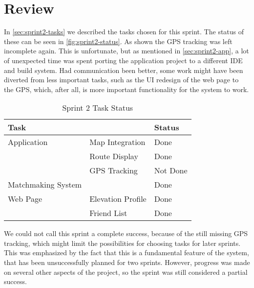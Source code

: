 \section{Review}
\label{sec:sprint2-review}

In \autoref{sec:sprint2-tasks} we described the tasks chosen for this sprint. The status of these can be seen in \autoref{fig:sprint2-status}. As shown the \ac{GPS} tracking was left incomplete again. This is unfortunate, but as mentioned in \autoref{sec:sprint2-app}, a lot of unexpected time was spent porting the application project to a different \ac{IDE} and build system. Had communication been better, some work might have been diverted from less important tasks, such as the \ac{UI} redesign of the web page to the \ac{GPS}, which, after all, is more important functionality for the system to work.

\begin{table}[!ht]
	\centering
	\begin{tabular}{|l l|l|}
		\hline
		\textbf{Task} && \textbf{Status} \\
		\hline
		Application & Map Integration & Done \\
		& Route Display & Done \\
		& \ac{GPS} Tracking & Not Done \\
		\hline
		Matchmaking System && Done \\
		\hline
		Web Page & Elevation Profile & Done \\
		& Friend List & Done \\
		\hline
	\end{tabular}
	\caption{Sprint 2 Task Status}
	\label{fig:sprint2-status}
\end{table}

We could not call this sprint a complete success, because of the still missing \ac{GPS} tracking, which might limit the possibilities for choosing tasks for later sprints. This was emphasized by the fact that this is a fundamental feature of the system, that has been unsuccessfully planned for two sprints. However, progress was made on several other aspects of the project, so the sprint was still considered a partial success.
